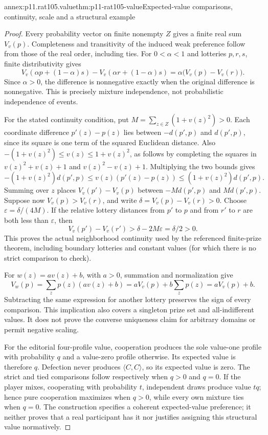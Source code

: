 \begin{annexitem}{annex:p11.rat105.value}{thm:p11-rat105-value}{Expected-value comparisons, continuity, scale and a structural example}
\begin{proof}
Every probability vector on finite nonempty \(Z\) gives a finite real
sum \(V_v(p)\). Completeness and transitivity of the induced weak
preference follow from those of the real order, including ties. For
\(0<\alpha<1\) and lotteries \(p,r,s\), finite distributivity gives
\[
 V_v(\alpha p+(1-\alpha)s)
   -V_v(\alpha r+(1-\alpha)s)
   =\alpha\bigl(V_v(p)-V_v(r)\bigr).
\]
Since \(\alpha>0\), the difference is nonnegative exactly when
the original difference is nonnegative. This is precisely mixture
independence, not probabilistic independence of events.

For the stated continuity condition, put
\(M=\sum_{z\in Z}(1+v(z)^2)>0\). Each coordinate difference
\(p'(z)-p(z)\) lies between \(-d(p',p)\) and \(d(p',p)\),
since its square is one term of the squared Euclidean distance.
Also \(-(1+v(z)^2)\leq v(z)\leq1+v(z)^2\), as follows by
completing the squares in \(v(z)^2+v(z)+1\) and
\(v(z)^2-v(z)+1\). Multiplying the two bounds gives
\[
 -(1+v(z)^2)d(p',p)
 \leq v(z)(p'(z)-p(z))
 \leq (1+v(z)^2)d(p',p).
\]
Summing over \(z\) places \(V_v(p')-V_v(p)\) between
\(-Md(p',p)\) and \(Md(p',p)\). Suppose now
\(V_v(p)>V_v(r)\), and write
\(\delta=V_v(p)-V_v(r)>0\). Choose
\(\varepsilon=\delta/(4M)\). If the relative lottery distances
from \(p'\) to \(p\) and from \(r'\) to \(r\) are both
less than \(\varepsilon\), then
\[
 V_v(p')-V_v(r')>
 \delta-2M\varepsilon=\delta/2>0.
\]
This proves the actual neighborhood continuity used by the referenced
finite-prize theorem, including boundary lotteries and constant values
(for which there is no strict comparison to check).

For \(w(z)=av(z)+b\), with \(a>0\), summation and normalization give
\[
 V_w(p)=\sum_zp(z)(av(z)+b)
       =aV_v(p)+b\sum_zp(z)=aV_v(p)+b.
\]
Subtracting the same expression for another lottery preserves the sign
of every comparison. This implication also covers a singleton prize
set and all-indifferent values. It does not prove the converse uniqueness
claim for arbitrary domains or permit negative scaling.

For the editorial four-profile value, cooperation produces the sole
value-one profile with probability \(q\) and a value-zero profile
otherwise. Its expected value is therefore \(q\). Defection never
produces \(\langle C,C\rangle\), so its expected value is zero.
The strict and tied comparisons follow respectively when \(q>0\)
and \(q=0\). If the player mixes, cooperating with probability
\(t\), independent draws produce value \(tq\); hence pure
cooperation maximizes when \(q>0\), while every own mixture ties
when \(q=0\). The construction specifies a coherent expected-value
preference; it neither proves that a real participant has it nor
justifies assigning this structural value normatively.
\end{proof}
\end{annexitem}
